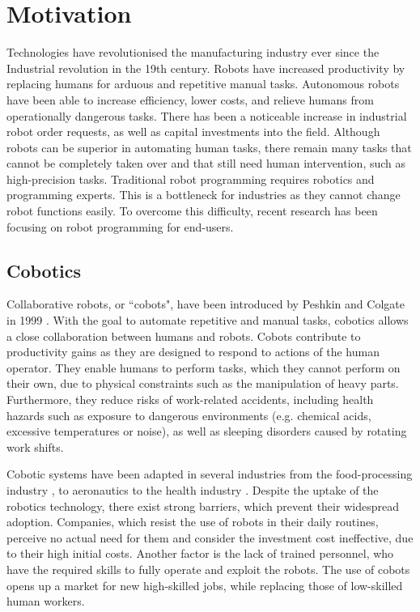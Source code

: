 \section{Motivation}
Technologies have revolutionised the manufacturing industry ever since the Industrial revolution in the 19th century.
Robots have increased productivity by replacing humans for arduous and repetitive manual tasks.
Autonomous robots have been able to increase efficiency, lower costs, and relieve humans from operationally dangerous tasks.
There has been a noticeable increase in industrial robot order requests, as well as capital investments into the field.
Although robots can be superior in automating human tasks,  there remain many tasks that cannot be completely taken over and that still need human intervention, such as high-precision tasks.
Traditional robot programming requires robotics and programming experts.
This is a bottleneck for industries as they cannot change robot functions easily.
To overcome this difficulty, recent research has been focusing on robot programming for end-users.


\subsection{Cobotics}\label{subsec:Cobotics}
Collaborative robots, or ``cobots", have been introduced by Peshkin and Colgate in 1999 \cite{colgate1999cobots}.
With the goal to automate repetitive and manual tasks, cobotics allows a close collaboration between humans and robots.
Cobots contribute to productivity gains as they are designed to respond to actions of the human operator.
They enable humans to perform tasks, which they cannot perform on their own, due to physical constraints such as the manipulation of heavy parts.
Furthermore, they reduce risks of work-related accidents, including health hazards such as exposure to dangerous environments (e.g.
chemical acids, excessive temperatures or noise), as well as sleeping disorders caused by rotating work shifts.


Cobotic systems have been adapted in several industries from the food-processing industry \cite{Food}, to aeronautics \cite{Airbus} to the health industry \cite{Ebola}.
Despite the uptake of the robotics technology, there exist strong barriers, which prevent their widespread adoption.
Companies, which resist the use of robots in their daily routines, perceive no actual need for them and consider the investment cost ineffective, due to their high initial costs.
Another factor is the lack of trained personnel, who have the required skills to fully operate and exploit the robots.
The use of cobots opens up a market for new high-skilled jobs, while replacing those of low-skilled human workers.


